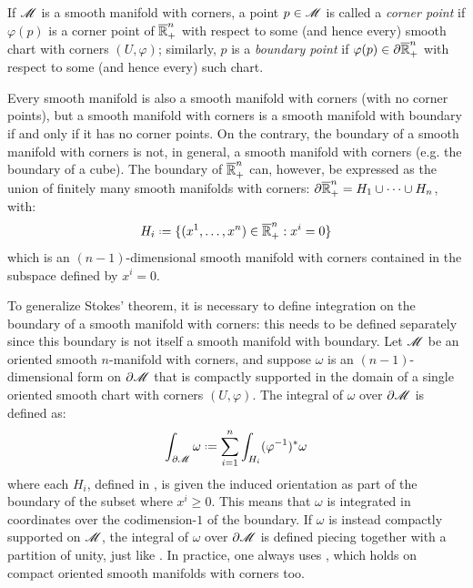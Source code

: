 If $ \mathscr{M} $ is a smooth manifold with corners, a point $ p \in \mathscr{M} $ is called a \emph{corner point} if $ \varphi(p) $ is a corner point of $ \overline{\mathbb{R}}_+^n $ with respect to some (and hence every) smooth chart with corners $ (U,\varphi) $; similarly, $ p $ is a \emph{boundary point} if $ \varphi(p) \in \partial \overline{\mathbb{R}}_+^n $ with respect to some (and hence every) such chart.

Every smooth manifold is also a smooth manifold with corners (with no corner points), but a smooth manifold with corners is a smooth manifold with boundary if and only if it has no corner points. On the contrary, the boundary of a smooth manifold with corners is not, in general, a smooth manifold with corners (e.g. the boundary of a cube). The boundary of $ \overline{\mathbb{R}}_+^n $ can, however, be expressed as the union of finitely many smooth manifolds with corners: $ \partial \overline{\mathbb{R}}_+^n = H_1 \cup \dots \cup H_n $, with:
\begin{equation}
  H_i \defeq \{(x^1 , \dots , x^n) \in \rp^n : x^i = 0\}
  \label{eq:boundary-rp}
\end{equation}
which is an $ (n-1) $-dimensional smooth manifold with corners contained in the subspace defined by $ x^i = 0 $.

To generalize Stokes' theorem, it is necessary to define integration on the boundary of a smooth manifold with corners: this needs to be defined separately since this boundary is not itself a smooth manifold with boundary. Let $ \mathscr{M} $ be an oriented smooth $ n $-manifold with corners, and suppose $ \omega $ is an $ (n-1) $-dimensional form on $ \partial \mathscr{M} $ that is compactly supported in the domain of a single oriented smooth chart with corners $ (U,\varphi) $. The integral of $ \omega $ over $ \partial \mathscr{M} $ is defined as:
\begin{equation*}
  \int_{\pa \man} \omega \defeq \sum_{i = 1}^n \int_{H_i} (\varphi^{-1})^* \omega
\end{equation*}
where each $ H_i $, defined in , is given the induced orientation as part of the boundary of the subset where $ x^i \geq 0 $. This means that $ \omega $ is integrated in coordinates over the codimension-$ 1 $ of the boundary. If $ \omega $ is instead compactly supported on $ \mathscr{M} $, the integral of $ \omega $ over $ \partial \mathscr{M} $ is defined piecing together with a partition of unity, just like . In practice, one always uses , which holds on compact oriented smooth manifolds with corners too.

